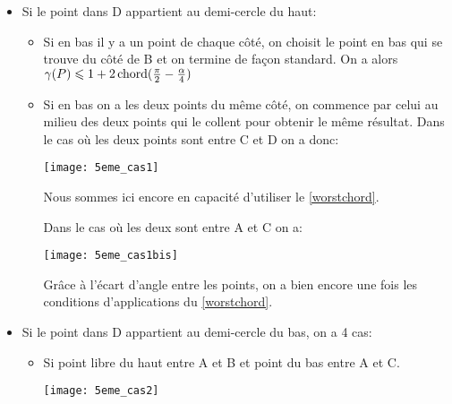 \begin{itemize}

\item \label{5cas1} Si le point dans D appartient au demi-cercle du haut:

\begin{itemize}

\item \label{5cas11} Si en bas il y a un point de chaque côté, on choisit le point en bas qui se trouve du côté de B et on termine de façon standard. On a alors $\gamma(P) \leqslant 1 + 2\operatorname{chord}(\frac{\pi}{2} - \frac{\alpha}{4})$

\item \label{5cas12} Si en bas on a les deux points du même côté, on commence par celui au milieu des deux points qui le collent pour obtenir le même résultat.
Dans le cas où les deux points sont entre C et D on a donc:

  \texttt{[image: 5eme\_cas1]}

Nous sommes ici encore en capacité d'utiliser le \cref{worstchord}.

\label{5cas13} Dans le cas où les deux sont entre A et C on a:

  \texttt{[image: 5eme\_cas1bis]}

Grâce à l'écart d'angle entre les points, on a bien encore une fois les
conditions d'applications du \cref{worstchord}.

\end{itemize}

\item \label{5cas2} Si le point dans D appartient au demi-cercle du bas, on a 4 cas:

\begin{itemize}

\item \label{5cas21} Si point libre du haut entre A et B et point du bas entre A et C.

  \texttt{[image: 5eme\_cas2]}


\end{itemize}
\end{itemize}
